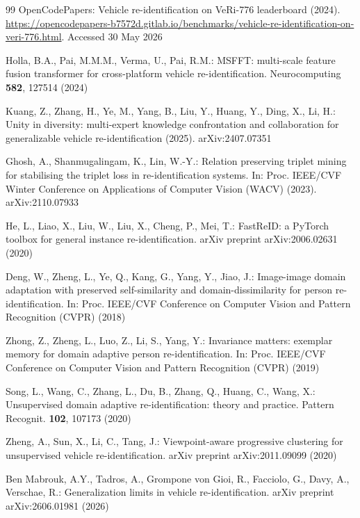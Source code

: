 \documentclass[10pt,a4paper]{article}
\begin{document}
\begin{thebibliography}{99}
OpenCodePapers: Vehicle re-identification on VeRi-776 leaderboard (2024).
\url{https://opencodepapers-b7572d.gitlab.io/benchmarks/vehicle-re-identification-on-veri-776.html}.
Accessed 30 May 2026

Holla, B.A., Pai, M.M.M., Verma, U., Pai, R.M.: MSFFT: multi-scale feature
fusion transformer for cross-platform vehicle re-identification.
Neurocomputing \textbf{582}, 127514 (2024)

Kuang, Z., Zhang, H., Ye, M., Yang, B., Liu, Y., Huang, Y., Ding, X., Li, H.:
Unity in diversity: multi-expert knowledge confrontation and collaboration for
generalizable vehicle re-identification (2025). arXiv:2407.07351

Ghosh, A., Shanmugalingam, K., Lin, W.-Y.: Relation preserving triplet mining
for stabilising the triplet loss in re-identification systems. In: Proc.
IEEE/CVF Winter Conference on Applications of Computer Vision (WACV) (2023).
arXiv:2110.07933

He, L., Liao, X., Liu, W., Liu, X., Cheng, P., Mei, T.: FastReID: a PyTorch
toolbox for general instance re-identification. arXiv preprint arXiv:2006.02631
(2020)

Deng, W., Zheng, L., Ye, Q., Kang, G., Yang, Y., Jiao, J.: Image-image domain
adaptation with preserved self-similarity and domain-dissimilarity for person
re-identification. In: Proc. IEEE/CVF Conference on Computer Vision and Pattern
Recognition (CVPR) (2018)

Zhong, Z., Zheng, L., Luo, Z., Li, S., Yang, Y.: Invariance matters: exemplar
memory for domain adaptive person re-identification. In: Proc. IEEE/CVF
Conference on Computer Vision and Pattern Recognition (CVPR) (2019)

Song, L., Wang, C., Zhang, L., Du, B., Zhang, Q., Huang, C., Wang, X.:
Unsupervised domain adaptive re-identification: theory and practice. Pattern
Recognit. \textbf{102}, 107173 (2020)

Zheng, A., Sun, X., Li, C., Tang, J.: Viewpoint-aware progressive clustering
for unsupervised vehicle re-identification. arXiv preprint arXiv:2011.09099
(2020)

Ben Mabrouk, A.Y., Tadros, A., Grompone von Gioi, R., Facciolo, G., Davy, A.,
Verschae, R.: Generalization limits in vehicle re-identification. arXiv
preprint arXiv:2606.01981 (2026)


\end{thebibliography}
\end{document}
